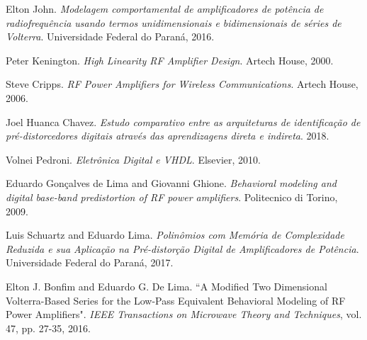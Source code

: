 \documentclass[twocolumn, a4paper]{article}
\begin{document}
\begin{thebibliography}{}

		
		Elton John. 
		\textit{Modelagem comportamental de amplificadores de potência de radiofrequência usando termos unidimensionais e bidimensionais de séries de Volterra}. 
		Universidade Federal do Paraná, 2016.
		
		Peter Kenington. 
		\textit{High Linearity RF Amplifier Design}. 
		Artech House, 2000.
		
		Steve Cripps. 
		\textit{RF Power Amplifiers for Wireless Communications}. 
		Artech House, 2006.
		
		Joel Huanca Chavez. 
		\textit{Estudo comparativo entre as arquiteturas de identificação de pré-distorcedores digitais através das aprendizagens direta e indireta}. 
		2018.
		
		Volnei Pedroni. 
		\textit{Eletrônica Digital e VHDL}. 
		Elsevier, 2010.
		
		Eduardo Gonçalves de Lima and Giovanni Ghione. 
		\textit{Behavioral modeling and digital base-band predistortion of RF power amplifiers}. 
		Politecnico di Torino, 2009.
		
		Luis Schuartz and Eduardo Lima. 
		\textit{Polinômios com Memória de Complexidade Reduzida e sua Aplicação na Pré-distorção Digital de Amplificadores de Potência}. 
		Universidade Federal do Paraná, 2017.
		
		Elton J. Bonfim and Eduardo G. De Lima. 
		``A Modified Two Dimensional Volterra-Based Series for the Low-Pass Equivalent Behavioral Modeling of RF Power Amplifiers". 
		\textit{IEEE Transactions on Microwave Theory and Techniques}, vol. 47, pp. 27-35, 2016.

	
\end{thebibliography}
\endgroup
\end{document}
